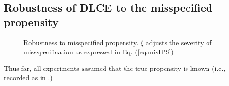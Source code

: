 \documentclass[manuscript,screen]{acmart}
\begin{document}
\subsection{Robustness of DLCE to the misspecified propensity}
\begin{figure}[htbp]
	\begin{center}
		\caption{Robustness to misspecified propensity. 
			$\xi$ adjusts the severity of missspecification as expressed in Eq. (\ref{eq:misIPS})}
		\label{fig:misIPS}
	\end{center}
\end{figure}
Thus far, all experiments assumed that the true propensity is known (i.e., recorded as in \cite{Lefortier16}.)
\end{document}
